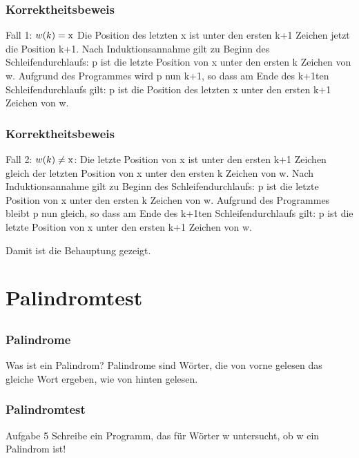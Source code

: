 \begin{frame}
	\frametitle{Korrektheitsbeweis}
	\begin{block}{Fall 1: $w(k)=\textnormal{x}$}
        	Die Position des letzten x ist unter den ersten k+1 Zeichen jetzt die Position k+1. Nach Induktionsannahme gilt zu Beginn des Schleifendurchlaufs: p ist die letzte Position von x unter den ersten k Zeichen von w. Aufgrund des Programmes wird p nun k+1, so dass am Ende des k+1ten Schleifendurchlaufs gilt: p ist die Position des letzten x unter den ersten k+1 Zeichen von w.
	\end{block}

\end{frame}

\begin{frame}
	\frametitle{Korrektheitsbeweis}
	\begin{block}{Fall 2: $w(k)\ne \textnormal{x}$:}
        	Die letzte Position von x ist unter den ersten k+1 Zeichen gleich der letzten Position von x unter den ersten k Zeichen von w. Nach Induktionsannahme gilt zu Beginn des Schleifendurchlaufs: p ist die letzte Position von x unter den ersten k Zeichen von w. Aufgrund des Programmes bleibt p nun gleich, so dass am Ende des k+1ten Schleifendurchlaufs gilt: p ist die letzte Position von x unter den ersten k+1 Zeichen von w.
	\end{block}
	Damit ist die Behauptung gezeigt.

\end{frame}



\section[Palindromtest]{Palindromtest}
\subsection*{}
\begin{frame}
	\frametitle{Palindrome}
	\begin{block}{Was ist ein Palindrom?}
		Palindrome sind Wörter, die von vorne gelesen das gleiche Wort ergeben, wie von hinten gelesen.
	\end{block}
\end{frame}

\begin{frame}
	\frametitle{Palindromtest}
	\begin{block}{Aufgabe 5}
		Schreibe ein Programm, das für Wörter w untersucht, ob w ein Palindrom ist!
	\end{block}

\end{frame}

